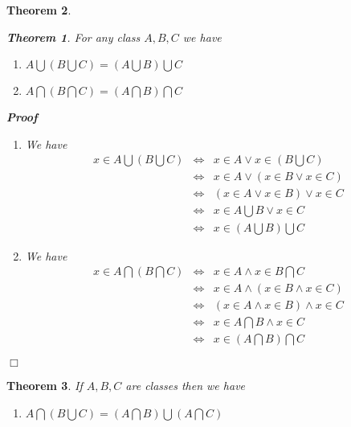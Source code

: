 \documentclass{book}
\newenvironment{proof}{\noindent\textbf{Proof\ }}{\hspace*{\fill}$\Box$\medskip}
\newtheorem{theorem}{Theorem}
\begin{document}
{{\begin{theorem}
  \begin{theorem}
    \label{associative laws of union and intersection}For any class $A, B, C$
    we have
    \begin{enumerate}
      \item $A \bigcup \left( B \bigcup C \right) = \left( A \bigcup B \right)
      \bigcup C$
      
      \item $A \bigcap \left( B \bigcap C \right) = \left( A \bigcap B \right)
      \bigcap C$
    \end{enumerate}
  \end{theorem}
  
  \begin{proof}
    
    \begin{enumerate}
      \item We have
      \begin{eqnarray*}
        x \in A \bigcup \left( B \bigcup C \right) & \Leftrightarrow & x \in A
        \vee x \in \left( B \bigcup C \right)\\
        & \Leftrightarrow & x \in A \vee (x \in B \vee x \in C)\\
        & \Leftrightarrow & (x \in A \vee x \in B) \vee x \in C\\
        & \Leftrightarrow & x \in A \bigcup B \vee x \in C\\
        & \Leftrightarrow & x \in \left( A \bigcup B \right) \bigcup C
      \end{eqnarray*}
      \item We have
      \begin{eqnarray*}
        x \in A \bigcap \left( B \bigcap C \right) & \Leftrightarrow & x \in A
        \wedge x \in B \bigcap C\\
        & \Leftrightarrow & x \in A \wedge (x \in B \wedge x \in C)\\
        & \Leftrightarrow & (x \in A \wedge x \in B) \wedge x \in C\\
        & \Leftrightarrow & x \in A \bigcap B \wedge x \in C\\
        & \Leftrightarrow & x \in \left( A \bigcap B \right) \bigcap C
      \end{eqnarray*}
    \end{enumerate}
  \end{proof}
\end{theorem}

\begin{theorem}
  \label{distributivity of union or intersection}If $A, B, C$ are classes then
  we have
  \begin{enumerate}
    \item $A \bigcap \left( B \bigcup C \right) = \left( A \bigcap B \right)
    \bigcup \left( A \bigcap C \right)$
    

\end{enumerate}
\end{theorem}}}
\end{document}
